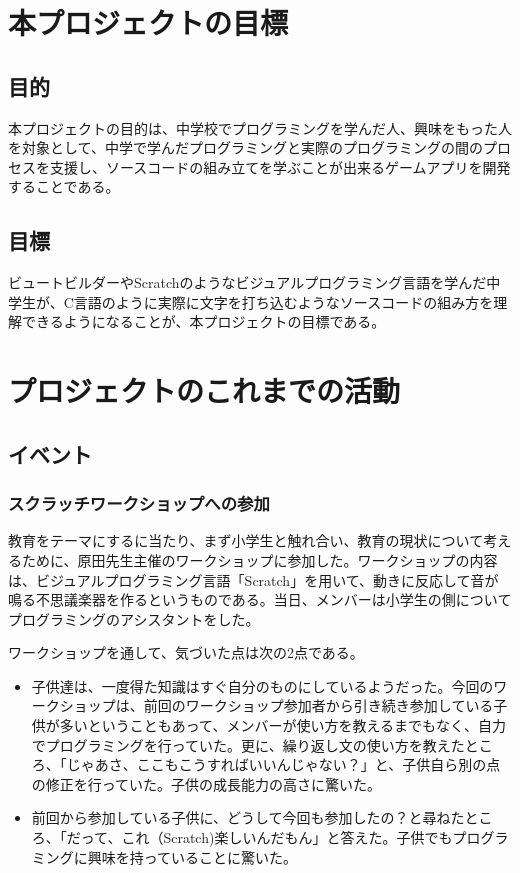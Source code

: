 \documentclass[openany,11pt,papersize]{jsbook}
\begin{document}
\chapter{本プロジェクトの目標}

\section{目的}\label{sec:mokuteki}
本プロジェクトの目的は、中学校でプログラミングを学んだ人、興味をもった人を対象として、中学で学んだプログラミングと実際のプログラミングの間のプロセスを支援し、ソースコードの組み立てを学ぶことが出来るゲームアプリを開発することである。


\section{目標}
ビュートビルダーやScratchのようなビジュアルプログラミング言語を学んだ中学生が、C言語のように実際に文字を打ち込むようなソースコードの組み方を理解できるようになることが、本プロジェクトの目標である。

\chapter{プロジェクトのこれまでの活動}

\section{イベント}

\subsection{スクラッチワークショップへの参加}
\par 教育をテーマにするに当たり、まず小学生と触れ合い、教育の現状について考えるために、原田先生主催のワークショップに参加した。ワークショップの内容は、ビジュアルプログラミング言語「Scratch」を用いて、動きに反応して音が鳴る不思議楽器を作るというものである。当日、メンバーは小学生の側についてプログラミングのアシスタントをした。
\par ワークショップを通して、気づいた点は次の2点である。
\begin{itemize}
\item 子供達は、一度得た知識はすぐ自分のものにしているようだった。今回のワークショップは、前回のワークショップ参加者から引き続き参加している子供が多いということもあって、メンバーが使い方を教えるまでもなく、自力でプログラミングを行っていた。更に、繰り返し文の使い方を教えたところ、「じゃあさ、ここもこうすればいいんじゃない？」と、子供自ら別の点の修正を行っていた。子供の成長能力の高さに驚いた。
\item 前回から参加している子供に、どうして今回も参加したの？と尋ねたところ、「だって、これ（Scratch)楽しいんだもん」と答えた。子供でもプログラミングに興味を持っていることに驚いた。
\end{itemize}
\end{document}
